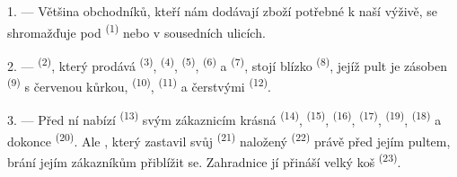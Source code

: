 %
%
%

\VUsaut{4.0mm}
\VUsaut{3.0mm}

\VUsaut{3.0mm}

1. --- Většina obchodníků, kteří nám dodávají zboží potřebné k naší výživě, se shromažďuje pod
 \textsuperscript{(1)}  nebo v sousedních ulicích.

2. ---  \textsuperscript{(2)}, který prodává 
\textsuperscript{(3)},  \textsuperscript{(4)}, 
\textsuperscript{(5)},  \textsuperscript{(6)} a 
\textsuperscript{(7)}, stojí blízko  \textsuperscript{(8)},
jejíž pult je zásoben  \textsuperscript{(9)} s červenou kůrkou,
 \textsuperscript{(10)}, 
\textsuperscript{(11)} a čerstvými
 \textsuperscript{(12)}.

3. --- Před ní nabízí  \textsuperscript{(13)} svým zákaznicím
krásná  \textsuperscript{(14)},  \textsuperscript{(15)},
 \textsuperscript{(16)},  \textsuperscript{(17)},
 \textsuperscript{(19)},  \textsuperscript{(18)} a dokonce
 \textsuperscript{(20)}. Ale
, který zastavil svůj 
\textsuperscript{(21)} naložený  \textsuperscript{(22)} právě před jejím
pultem, brání jejím zákazníkům přiblížit se. Zahradnice jí přináší velký koš
 \textsuperscript{(23)}.

